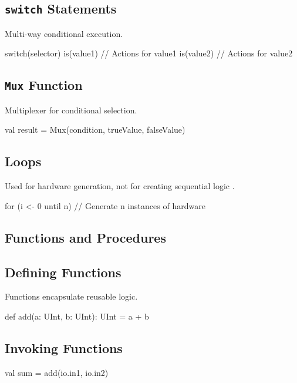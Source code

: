 \subsection{\texttt{switch} Statements}
Multi-way conditional execution.
\begin{chiselcode}
switch(selector) {
  is(value1) {
    // Actions for value1
  }
  is(value2) {
    // Actions for value2
  }
}
\end{chiselcode}

\subsection{\texttt{Mux} Function}
Multiplexer for conditional selection.
\begin{chiselcode}
val result = Mux(condition, trueValue, falseValue)
\end{chiselcode}

\subsection{Loops}
Used for hardware generation, not for creating sequential logic \cite{chisel-tutorial}.
\begin{chiselcode}
for (i <- 0 until n) {
  // Generate n instances of hardware
}
\end{chiselcode}

\subsection{Functions and Procedures}
\subsection{Defining Functions}
Functions encapsulate reusable logic.
\begin{chiselcode}
def add(a: UInt, b: UInt): UInt = {
  a + b
}
\end{chiselcode}

\subsection{Invoking Functions}
\begin{chiselcode}
val sum = add(io.in1, io.in2)
\end{chiselcode}


